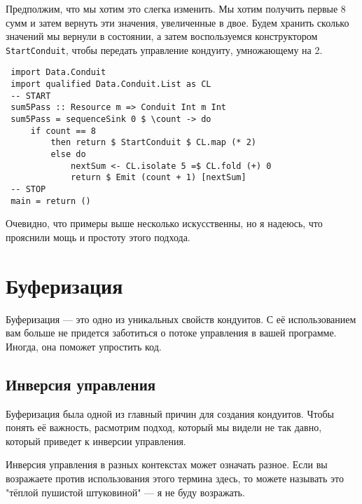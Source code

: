 {Предполжим, что мы хотим это слегка изменить. Мы хотим получить первые 8 сумм и 
затем вернуть эти значения, увеличенные в двое. Будем хранить сколько значений 
мы вернули в состоянии, а затем воспользуемся конструктором 
\lstinline'StartConduit', чтобы передать управление кондуиту, умножающему на 2.
\begin{lstlisting}
 import Data.Conduit
 import qualified Data.Conduit.List as CL
 -- START
 sum5Pass :: Resource m => Conduit Int m Int
 sum5Pass = sequenceSink 0 $ \count -> do
     if count == 8
         then return $ StartConduit $ CL.map (* 2)
         else do
             nextSum <- CL.isolate 5 =$ CL.fold (+) 0
             return $ Emit (count + 1) [nextSum]
 -- STOP
 main = return ()
\end{lstlisting}
Очевидно, что примеры выше несколько искусственны, но я надеюсь, что прояснили 
мощь и простоту этого подхода. 
 
\section{Буферизация}

Буферизация --- это одно из уникальных свойств кондуитов. С её использованием 
вам больше не придется заботиться о потоке управления в вашей программе.
Иногда, она поможет упростить код.

\subsection{Инверсия управления}

Буферизация была одной из главный причин для создания кондуитов. Чтобы понять её 
важность, расмотрим подход, который мы видели не так давно, который приведет к 
инверсии управления.

\begin{remark}
Инверсия управления в разных контекстах может означать разное. Если вы возражаете 
против использования этого термина здесь, то можете называть это 
"тёплой пушистой штуковиной" --- я не буду возражать.
\end{remark}

}
